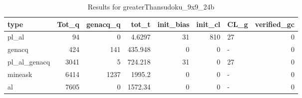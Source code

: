 \begin{table}[ht]
\caption{Results for greaterThansudoku_9x9_24b}
\begin{tabular}{lrrrrrlr}
\hline
 type         &   Tot\_q &   genacq\_q &     tot\_t &   init\_bias &   init\_cl & CL\_g   &   verified\_gc \\
\hline
 pl\_al        &      94 &          0 &    4.6297 &          31 &       810 & 27     &             0 \\
 genacq       &     424 &        141 &  435.948  &           0 &         0 & -      &             0 \\
 pl\_al\_genacq &    3041 &          5 &  724.218  &          31 &         0 & 27     &             0 \\
 mineask      &    6414 &       1237 & 1995.2    &           0 &         0 & -      &             0 \\
 al           &    7605 &          0 & 1572.34   &           0 &         0 & -      &             0 \\
\hline
\end{tabular}
\end{table}